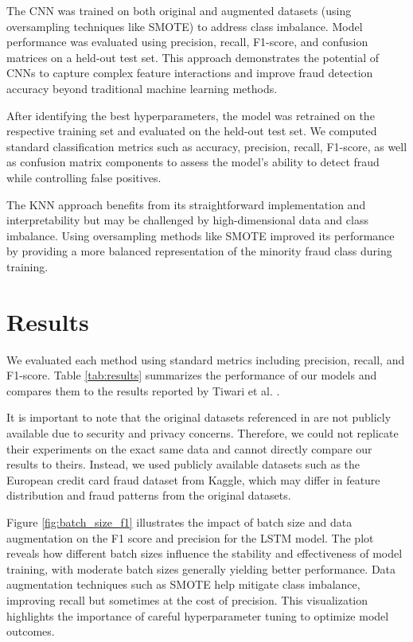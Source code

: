 \documentclass{article}
\begin{document}
The CNN was trained on both original and augmented datasets (using oversampling techniques like SMOTE) to address class imbalance. Model performance was evaluated using precision, recall, F1-score, and confusion matrices on a held-out test set. This approach demonstrates the potential of CNNs to capture complex feature interactions and improve fraud detection accuracy beyond traditional machine learning methods.

After identifying the best hyperparameters, the model was retrained on the respective training set and evaluated on the held-out test set. We computed standard classification metrics such as accuracy, precision, recall, F1-score, as well as confusion matrix components to assess the model’s ability to detect fraud while controlling false positives.

The KNN approach benefits from its straightforward implementation and interpretability but may be challenged by high-dimensional data and class imbalance. Using oversampling methods like SMOTE improved its performance by providing a more balanced representation of the minority fraud class during training.


\section{Results}

We evaluated each method using standard metrics including precision, recall, and F1-score. Table \ref{tab:results} summarizes the performance of our models and compares them to the results reported by Tiwari et al. \cite{tiwari2021credit}.

It is important to note that the original datasets referenced in \cite{tiwari2021credit} are not publicly available due to security and privacy concerns. Therefore, we could not replicate their experiments on the exact same data and cannot directly compare our results to theirs. Instead, we used publicly available datasets such as the European credit card fraud dataset from Kaggle, which may differ in feature distribution and fraud patterns from the original datasets.

Figure \ref{fig:batch_size_f1} illustrates the impact of batch size and data augmentation on the F1 score and precision for the LSTM model. The plot reveals how different batch sizes influence the stability and effectiveness of model training, with moderate batch sizes generally yielding better performance. Data augmentation techniques such as SMOTE help mitigate class imbalance, improving recall but sometimes at the cost of precision. This visualization highlights the importance of careful hyperparameter tuning to optimize model outcomes.
\end{document}
